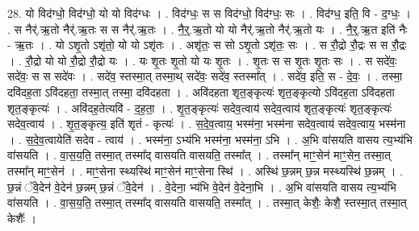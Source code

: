 \documentclass[17pt]{extarticle}
\begin{document}
28. यो विद॑ग्धो॒ विद॑ग्धो॒ यो यो विद॑ग्धः । . विद॑ग्धः॒ स स विद॑ग्धो॒ विद॑ग्धः॒ सः । . विद॑ग्ध॒ इति॒ वि - द॒ग्धः॒ । . स नैर्॑.ऋ॒तो नैर्॑.ऋ॒तः स स नैर्॑.ऋ॒तः । . नै॒र्॒.ऋ॒तो यो यो नैर्॑.ऋ॒तो नैर्॑.ऋ॒तो यः । . नै॒र्॒.ऋ॒त इति॑ नैः - ऋ॒तः । . यो ऽशृ॒तो ऽशृ॑तो॒ यो यो ऽशृ॑तः । . अशृ॑तः॒ स सो ऽशृ॒तो ऽशृ॑तः॒ सः । . स रौ॒द्रो रौ॒द्रः स स रौ॒द्रः । . रौ॒द्रो यो यो रौ॒द्रो रौ॒द्रो यः । . यः शृ॒तः शृ॒तो यो यः शृ॒तः । . शृ॒तः स स शृ॒तः शृ॒तः सः । . स सदे॑वः॒ सदे॑वः॒ स स सदे॑वः । . सदे॑व॒ स्तस्मा॒त् तस्मा॒थ् सदे॑वः॒ सदे॑व॒ स्तस्मा᳚त् । . सदे॑व॒ इति॒ स - दे॒वः॒ । . तस्मा॒ दवि॑दह॒ता ऽवि॑दहता॒ तस्मा॒त् तस्मा॒ दवि॑दहता । . अवि॑दहता शृत॒ङ्कृत्यः॑ शृत॒ङ्कृत्यो ऽवि॑दह॒ता ऽवि॑दहता शृत॒ङ्कृत्यः॑ । . अवि॑दह॒तेत्यवि॑ - द॒ह॒ता॒ । . शृ॒त॒ङ्कृत्यः॑ सदेव॒त्वाय॑ सदेव॒त्वाय॑ शृत॒ङ्कृत्यः॑ शृत॒ङ्कृत्यः॑ सदेव॒त्वाय॑ । . शृ॒त॒ङ्कृत्य॒ इति॑ शृतं - कृत्यः॑ । . स॒दे॒व॒त्वाय॒ भस्म॑ना॒ भस्म॑ना सदेव॒त्वाय॑ सदेव॒त्वाय॒ भस्म॑ना । . स॒दे॒व॒त्वायेति॑ सदेव - त्वाय॑ । . भस्म॑ना॒ ऽभ्य॑भि भस्म॑ना॒ भस्म॑ना॒ ऽभि । . अ॒भि वा॑सयति वासय त्य॒भ्य॑भि वा॑सयति । . वा॒स॒य॒ति॒ तस्मा॒त् तस्मा᳚द् वासयति वासयति॒ तस्मा᳚त् । . तस्मा᳚न् माꣳ॒॒सेन॑ माꣳ॒॒सेन॒ तस्मा॒त् तस्मा᳚न् माꣳ॒॒सेन॑ । . माꣳ॒॒सेना स्थ्यस्थि॑ माꣳ॒॒सेन॑ माꣳ॒॒सेना स्थि॑ । . अस्थि॑ छ॒न्नम् छ॒न्न मस्थ्यस्थि॑ छ॒न्नम् । . छ॒न्नं ॅवे॒देन॑ वे॒देन॑ छ॒न्नम् छ॒न्नं ॅवे॒देन॑ । . वे॒देना॒ भ्य॑भि वे॒देन॑ वे॒देना॒भि । . अ॒भि वा॑सयति वासय त्य॒भ्य॑भि वा॑सयति । . वा॒स॒य॒ति॒ तस्मा॒त् तस्मा᳚द् वासयति वासयति॒ तस्मा᳚त् । . तस्मा॒त् केशैः॒ केशै॒ स्तस्मा॒त् तस्मा॒त् केशैः᳚ । \newline
\end{document}
